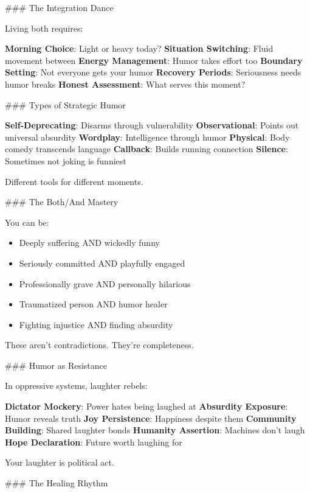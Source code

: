 \documentclass[12pt]{book}
\begin{document}
\#\#\# The Integration Dance

Living both requires:

\textbf{Morning Choice}: Light or heavy today?
\textbf{Situation Switching}: Fluid movement between
\textbf{Energy Management}: Humor takes effort too
\textbf{Boundary Setting}: Not everyone gets your humor
\textbf{Recovery Periods}: Seriousness needs humor breaks
\textbf{Honest Assessment}: What serves this moment?

\#\#\# Types of Strategic Humor

\textbf{Self-Deprecating}: Disarms through vulnerability
\textbf{Observational}: Points out universal absurdity
\textbf{Wordplay}: Intelligence through humor
\textbf{Physical}: Body comedy transcends language
\textbf{Callback}: Builds running connection
\textbf{Silence}: Sometimes not joking is funniest

Different tools for different moments.

\#\#\# The Both/And Mastery

You can be:
\begin{itemize}
\item Deeply suffering AND wickedly funny
\item Seriously committed AND playfully engaged
\item Professionally grave AND personally hilarious
\item Traumatized person AND humor healer
\item Fighting injustice AND finding absurdity

\end{itemize}
These aren't contradictions. They're completeness.

\#\#\# Humor as Resistance

In oppressive systems, laughter rebels:

\textbf{Dictator Mockery}: Power hates being laughed at
\textbf{Absurdity Exposure}: Humor reveals truth
\textbf{Joy Persistence}: Happiness despite them
\textbf{Community Building}: Shared laughter bonds
\textbf{Humanity Assertion}: Machines don't laugh
\textbf{Hope Declaration}: Future worth laughing for

Your laughter is political act.

\#\#\# The Healing Rhythm
\end{document}
